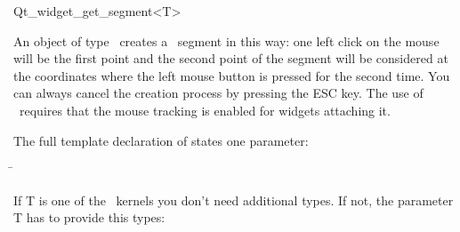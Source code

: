 
\begin{ccRefClass}{Qt_widget_get_segment<T>}

\ccDefinition
An object of type \ccRefName\ creates a \cgal\ segment in this 
way: one left click on the mouse will be the first point and the second point 
of the segment will be considered at the coordinates where the left
mouse button is pressed for the second time.
You can always cancel the creation process by pressing the ESC key.
The use of \ccRefName\ requires that the mouse tracking is
enabled for widgets attaching it.


\ccParameters

The full template declaration of  states one parameter:

\begin{tabbing}
 \=\\
\end{tabbing}

If T is one of the \cgal\ kernels you don't need additional types. If
not, the parameter T has to provide this types:

\ccTypes
{}

\ccInheritsFrom
{}

\ccGlue

\ccCreation
{}


\end{ccRefClass}








